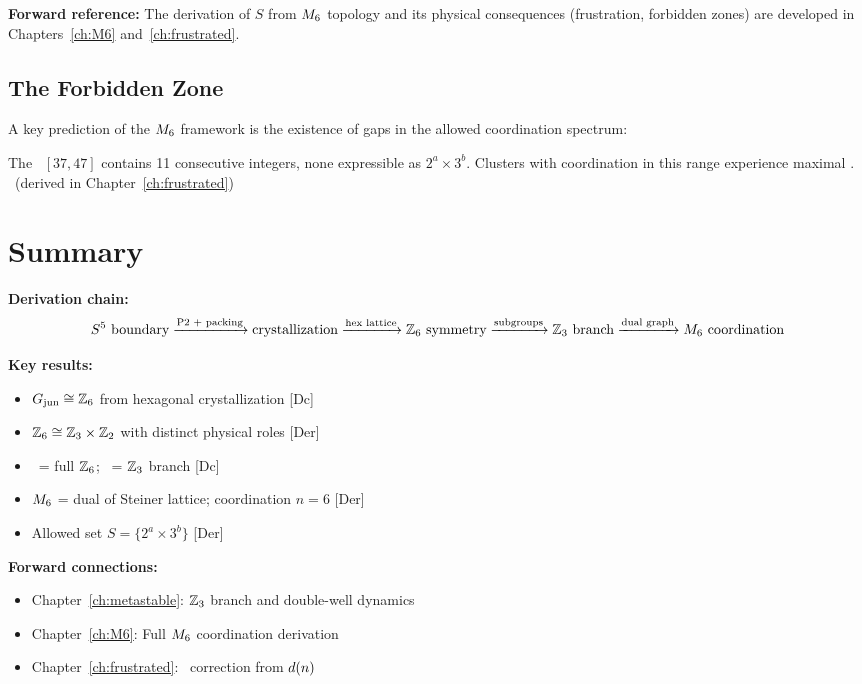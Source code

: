\textbf{Forward reference:} The derivation of $S$ from $M_6$ topology and
its physical consequences (frustration, forbidden zones) are developed in
Chapters~\ref{ch:M6} and~\ref{ch:frustrated}.

\subsection{The Forbidden Zone}

A key prediction of the $M_6$ framework is the existence of gaps in the
allowed coordination spectrum:

\begin{resultbox}[title=Forbidden Zone Preview]
    The \ForbiddenZone\ $[37, 47]$ contains 11 consecutive integers, none
    expressible as $2^a \times 3^b$. Clusters with coordination in this
    range experience maximal \Frustration.
    \tagDer\ (derived in Chapter~\ref{ch:frustrated})
\end{resultbox}

\section{Summary}
\label{sec:junction:summary}

\begin{resultbox}[title=Chapter 2 Summary: Junction Symmetries]
    \textbf{Derivation chain:}
    \[
        S^5 \text{ boundary} \xrightarrow{\text{P2 + packing}}
        \text{crystallization} \xrightarrow{\text{hex lattice}}
        \mathbb{Z}_6 \text{ symmetry} \xrightarrow{\text{subgroups}}
        \mathbb{Z}_3 \text{ branch} \xrightarrow{\text{dual graph}}
        M_6 \text{ coordination}
    \]

    \textbf{Key results:}
    \begin{itemize}
        \item $G_{\text{jun}} \cong \mathbb{Z}_6$ from hexagonal crystallization [Dc]
        \item $\mathbb{Z}_6 \cong \mathbb{Z}_3 \times \mathbb{Z}_2$ with distinct physical roles [Der]
        \item \AnchorJunction\ = full $\mathbb{Z}_6$; \MetastableJunction\ = $\mathbb{Z}_3$ branch [Dc]
        \item $M_6$ = dual of Steiner lattice; coordination $n = 6$ [Der]
        \item Allowed set $S = \{2^a \times 3^b\}$ [Der]
    \end{itemize}

    \textbf{Forward connections:}
    \begin{itemize}
        \item Chapter~\ref{ch:metastable}: $\mathbb{Z}_3$ branch and double-well dynamics
        \item Chapter~\ref{ch:M6}: Full $M_6$ coordination derivation
        \item Chapter~\ref{ch:frustrated}: \Frustration\ correction from $d(n)$
    \end{itemize}
\end{resultbox}

